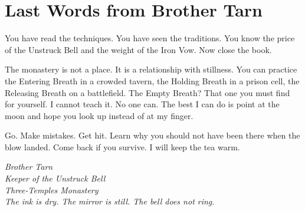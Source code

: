 \documentclass[11pt]{book}
\begin{document}
\chapter{Last Words from Brother Tarn}

You have read the techniques. You have seen the traditions. You know the price of the Unstruck Bell and the weight of the Iron Vow. Now close the book.

The monastery is not a place. It is a relationship with stillness. You can practice the Entering Breath in a crowded tavern, the Holding Breath in a prison cell, the Releasing Breath on a battlefield. The Empty Breath? That one you must find for yourself. I cannot teach it. No one can. The best I can do is point at the moon and hope you look up instead of at my finger.

Go. Make mistakes. Get hit. Learn why you should not have been there when the blow landed. Come back if you survive. I will keep the tea warm.

\textit{Brother Tarn\\
Keeper of the Unstruck Bell\\
Three-Temples Monastery\\
The ink is dry. The mirror is still. The bell does not ring.}
\end{document}
